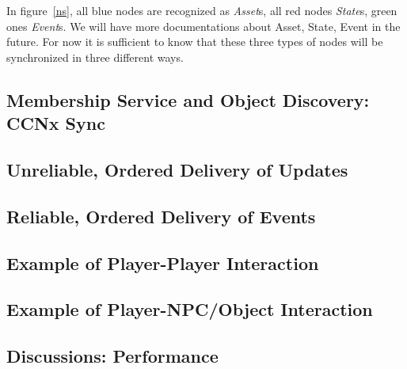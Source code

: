 \documentclass{article}
\begin{document}
In figure~\ref{ns}, all blue nodes are recognized as \emph{Asset}s, all red nodes \emph{State}s, green ones \emph{Event}s. We will have more documentations about Asset, State, Event in the future. For now it is sufficient to know that these three types of nodes will be synchronized in three different ways.

\subsection{Membership Service and Object Discovery: CCNx Sync}

\subsection{Unreliable, Ordered Delivery of Updates}

\subsection{Reliable, Ordered Delivery of Events}

\subsection{Example of Player-Player Interaction}

\subsection{Example of Player-NPC/Object Interaction}

\subsection{Discussions: Performance}



\end{document}
